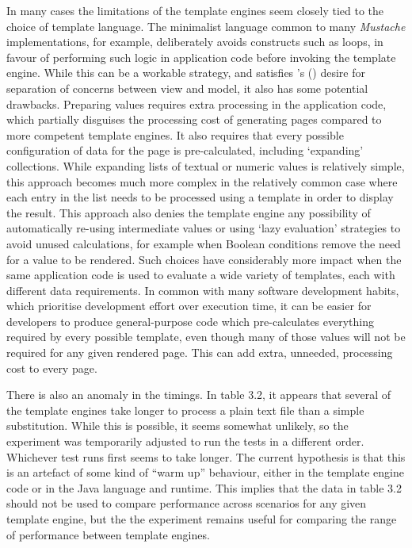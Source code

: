 In many cases the limitations of the template engines seem closely tied to the choice of template language. The minimalist language common to many \emph{Mustache} implementations, for example, deliberately avoids constructs such as loops, in favour of performing such logic in application code before invoking the template engine. While this can be a workable strategy, and satisfies \citeauthor{Parr2004}'s (\citeyear{Parr2004}) desire for separation of concerns between view and model, it also has some potential drawbacks. Preparing values requires extra processing in the application code, which partially disguises the processing cost of generating pages compared to more competent template engines. It also requires that every possible configuration of data for the page is pre-calculated, including `expanding' collections. While expanding lists of textual or numeric values is relatively simple, this approach becomes much more complex in the relatively common case where each entry in the list needs to be processed using a template in order to display the result. This approach also denies the template engine any possibility of automatically re-using intermediate values or using `lazy evaluation' strategies to avoid unused calculations, for example when Boolean conditions remove the need for a value to be rendered. Such choices have considerably more impact when the same application code is used to evaluate a wide variety of templates, each with different data requirements. In common with many software development habits, which prioritise development effort over execution time, it can be easier for developers to produce general-purpose code which pre-calculates everything required by every possible template, even though many of those values will not be required for any given rendered page. This can add extra, unneeded, processing cost to every page.

There is also an anomaly in the timings. In table 3.2, it appears that several of the template engines take longer to process a plain text file than a simple substitution. While this is possible, it seems somewhat unlikely, so the experiment was temporarily adjusted to run the tests in a different order. Whichever test runs first seems to take longer. The current hypothesis is that this is an artefact of some kind of “warm up” behaviour, either in the template engine code or in the Java language and runtime. This implies that the data in table 3.2 should not be used to compare performance across scenarios for any given template engine, but the the experiment remains useful for comparing the range of performance between template engines.

